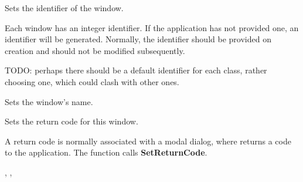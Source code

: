 Sets the identifier of the window.


Each window has an integer identifier. If the application has not provided one,
an identifier will be generated. Normally, the identifier should be provided
on creation and should not be modified subsequently.

TODO: perhaps there should be a default identifier for each class, rather
choosing one, which could clash with other ones.




\label{wxwindowsetname}


Sets the window's name.





\label{wxwindowsetreturncode}


Sets the return code for this window.




A return code is normally associated with a modal dialog, where  returns
a code to the application. The function  calls {\bf SetReturnCode}.


, ,\rtfsp
{}

\label{wxwindowsetscrollbar}


